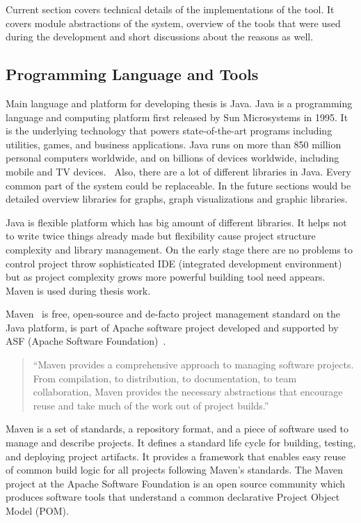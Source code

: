 
Current section covers technical details of the implementations of the tool. It covers module abstractions of the system, overview of the tools that were used during the development and
short discussions about the reasons as well.

\subsection{Programming Language and Tools}

Main language and platform for developing thesis is Java. Java is a programming language and computing
platform first released by Sun Microsystems in 1995. It is the underlying technology that powers state-of-the-art
programs including utilities, games, and business applications. Java runs on more than 850 million personal computers worldwide,
and on billions of devices worldwide, including mobile and TV devices.~\cite{java_com}
Also, there are a lot of different libraries in Java. Every common part of the system could be replaceable.
In the future sections would be detailed overview libraries for graphs, graph visualizations and graphic libraries.


Java is flexible platform which has big amount of different libraries. It helps not to write twice things already made but flexibility cause project structure complexity and library management. On the early stage there are no problems to control project throw sophisticated IDE (integrated development environment) but as project complexity grows more powerful building tool need appears. Maven is used during thesis work.


Maven~\cite{MAVEN_HOME_PAGE} is free, open-source and de-facto project management standard on the Java platform,
is part of Apache software project developed and supported by ASF (Apache Software Foundation)~\cite{APACHE_FOUNDATION_HOME_PAGE}.

\begin{quotation}
``Maven provides a comprehensive approach to managing software projects.
From compilation, to distribution, to documentation, to team collaboration,
Maven provides the necessary abstractions that encourage reuse and take much of the work out of project builds.''~\cite{MAVEN_BOOK_1}
\end{quotation}

Maven is a set of standards, a repository format, and a piece of software used to manage and describe projects.
It defines a standard life cycle for building, testing, and deploying project artifacts.
It provides a framework that enables easy reuse of common build logic for all projects following Maven's standards.
The Maven project at the Apache Software Foundation is an open source community which produces software tools that
understand a common declarative Project Object Model (POM).~\cite{MAVEN_BOOK_2}


